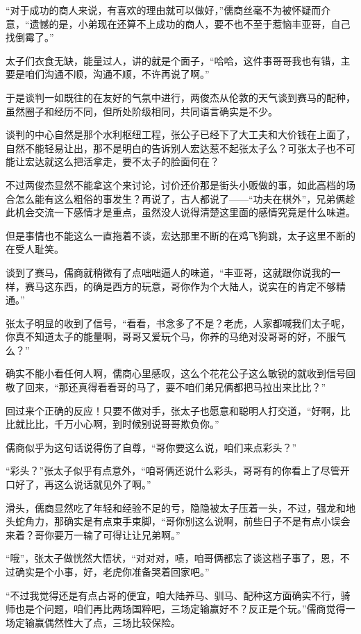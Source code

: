 “对于成功的商人来说，有喜欢的理由就可以做好，”儒商丝毫不为被怀疑而介意，“遗憾的是，小弟现在还算不上成功的商人，要不也不至于惹恼丰亚哥，自己找倒霉了。”

太子们衣食无缺，能量过人，讲的就是个面子，“哈哈，这件事哥哥我也有错，主要是咱们沟通不顺，沟通不顺，不许再说了啊。”

于是谈判一如既往的在友好的气氛中进行，两俊杰从伦敦的天气谈到赛马的配种，虽然圈子和经历不同，但所处阶级相同，共同语言确实是不少。

谈判的中心自然是那个水利枢纽工程，张公子已经下了大工夫和大价钱在上面了，自然不能轻易让出，那不是明白的告诉别人宏达惹不起张太子么？可张太子也不可能让宏达就这么把活拿走，要不太子的脸面何在？

不过两俊杰显然不能拿这个来讨论，讨价还价那是街头小贩做的事，如此高档的场合怎么能有这么粗俗的事发生？再说了，古人都说了——“功夫在棋外”，兄弟俩趁此机会交流一下感情才是重点，虽然没人说得清楚这里面的感情究竟是什么味道。

但是事情也不能这么一直拖着不谈，宏达那里不断的在鸡飞狗跳，太子这里不断的在受人耻笑。

谈到了赛马，儒商就稍微有了点咄咄逼人的味道，“丰亚哥，这就跟你说我的一样，赛马这东西，的确是西方的玩意，哥你作为个大陆人，说实在的肯定不够精通。”

张太子明显的收到了信号，“看看，书念多了不是？老虎，人家都喊我们太子呢，你真不知道太子的能量啊，哥哥又爱玩个马，你养的马绝对没哥哥的好，不服气么？”

确实不能小看任何人啊，儒商心里感叹，这么个花花公子这么敏锐的就收到信号回敬了回来，“那还真得看看哥的马了，要不咱们弟兄俩都把马拉出来比比？”

回过来个正确的反应！只要不做对手，张太子也愿意和聪明人打交道，“好啊，比比就比比，千万小心啊，到时候别说哥哥欺负你。”

儒商似乎为这句话说得伤了自尊，“哥你要这么说，咱们来点彩头？”

“彩头？”张太子似乎有点意外，“咱哥俩还说什么彩头，哥哥有的你看上了尽管开口好了，再这么说话就见外了啊。”

滑头，儒商显然吃了年轻和经验不足的亏，隐隐被太子压着一头，不过，强龙和地头蛇角力，那确实是有点束手束脚，“哥你别这么说啊，前些日子不是有点小误会来着？哥你要万一输了可得让让兄弟啊。”

“哦”，张太子做恍然大悟状，“对对对，啧，咱哥俩都忘了谈这档子事了，恩，不过确实是个小事，好，老虎你准备哭着回家吧。”

“不过我觉得还是有点占哥的便宜，咱大陆养马、驯马、配种这方面确实不行，骑师也是个问题，咱们再比两场国粹吧，三场定输赢好不？反正是个玩。”儒商觉得一场定输赢偶然性大了点，三场比较保险。

